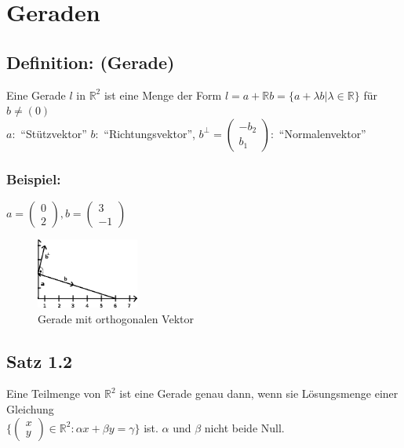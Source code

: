 \section{Geraden}
%
%
%
\subsection{Definition: (Gerade)}
%
%
%
Eine Gerade $l$ in $\mathbb{R}^{2}$ ist eine Menge der Form $l=a+\mathbb{R}b=\{a+\lambda b|\lambda \in \mathbb{R}\}$ für $b \neq (0)$\\
$a:$ "`Stützvektor"' \quad $b:$ "`Richtungsvektor"', \quad $b^{\perp}=\begin{pmatrix}-b_{2} \\ b_{1} \end{pmatrix}:$ "`Normalenvektor"'
%
\subsubsection{Beispiel: }
$a=\begin{pmatrix} 0 \\ 2 \end{pmatrix}, b=\begin{pmatrix} 3 \\ -1 \end{pmatrix}$
\begin{figure}[H]
	\centering
	\includegraphics[width=0.3\textwidth]
	{mainmatter/chapter1/pics/orthovek.png}
	\caption{Gerade mit orthogonalen Vektor} 
\end{figure}



\subsection{Satz 1.2}
Eine Teilmenge von $\mathbb{R}^{2}$ ist eine Gerade genau dann, wenn sie Lösungsmenge einer Gleichung \\
$\{\begin{pmatrix}x \\ y \end{pmatrix} \in \mathbb{R}^{2} : \alpha x + \beta y = \gamma\}$ ist. $\alpha$ und $\beta$ nicht beide Null.
%
%
%
